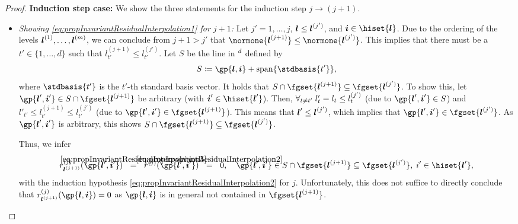 \begin{proof}
  \noindent
  \textbf{Induction step case:}
  We show the three statements for the induction step $j \to (j + 1)$.
  \begin{itemize}
    \item
    \emph{Showing \eqref{eq:propInvariantResidualInterpolation1} for $j + 1$:}
    Let $j' = 1, \dotsc, j$, ${\boldsymbol{l}} \le {\boldsymbol{l}}^{(j')}$,
    and $\*i \in \hiset{\*l}$.
    Due to the ordering of the levels ${\boldsymbol{l}}^{(1)}, \dotsc, {\boldsymbol{l}}^{(m)}$,
    we can conclude from $j + 1 > j'$ that
    $\normone{\*l^{(j+1)}} \le \normone{\*l^{(j')}}$.
    This implies that there must be a $t' \in \{1, \dotsc, d\}$
    such that $l_{t'}^{(j+1)} \le l_{t'}^{(j')}$.
    Let $S$ be the line in $\real^d$ defined by
    \begin{equation}
      S
      \ceq \gp{\*l,\*i} + \spn\{\stdbasis{t'}\},
    \end{equation}
    where $\stdbasis{t'}$ is the $t'$-th standard basis vector.
    It holds that $S \cap \fgset{\*l^{(j+1)}} \subset \fgset{\*l^{(j')}}$.
    To show this, let $\gp{\*l',\*i'} \in S \cap \fgset{\*l^{(j+1)}}$
    be arbitrary (with $\*i' \in \hiset{\*l'}$).
    Then, $\forall_{t \not= t'}\;l'_t = l_t \le l_t^{(j')}$
    (due to $\gp{\*l',\*i'} \in S$) and
    $l'_{t'} \le l_{t'}^{(j+1)} \le l_{t'}^{(j')}$
    (due to $\gp{\*l',\*i'} \in \fgset{\*l^{(j+1)}}$).
    This means that ${\boldsymbol{l}}' \le {\boldsymbol{l}}^{(j')}$, which implies that
    $\gp{\*l',\*i'} \in \fgset{\*l^{(j')}}$.
    As $\gp{\*l',\*i'}$ is arbitrary,
    this shows $S \cap \fgset{\*l^{(j+1)}} \subset \fgset{\*l^{(j')}}$.
    
    Thus, we infer
    \begin{equation}
      \label{eq:proofPropInvariantResidualInterpolation2}
      r_{\*l^{(j+1)}}^{(j)}(\gp{\*l',\*i'})
      \eqwithref{5}
      r^{(j)}(\gp{\*l',\*i'})
      \eqwithref{2}
      0,\quad
      \gp{\*l',\*i'} \in S \cap \fgset{\*l^{(j+1)}}
      \subset \fgset{\*l^{(j')}},\;
      i' \in \hiset{\*l'},
    \end{equation}
    with the induction hypothesis
    \eqref{eq:propInvariantResidualInterpolation2} for $j$.
    Unfortunately, this does not suffice to directly conclude that
    $r_{\*l^{(j+1)}}^{(j)}(\gp{\*l,\*i}) = 0$ as
    $\gp{\*l,\*i}$ is in general not contained in $\fgset{\*l^{(j+1)}}$.
    

\end{itemize}
\end{proof}
